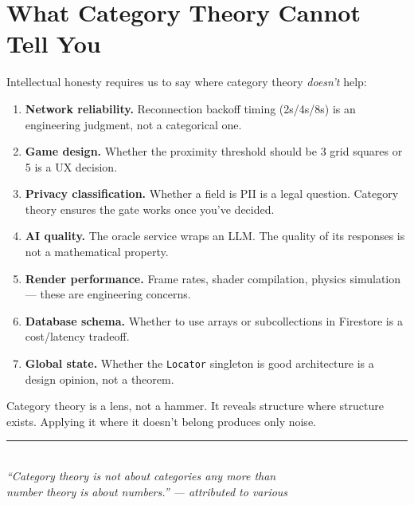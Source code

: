 \documentclass[12pt,a4paper]{article}
\theoremstyle{definition}
\theoremstyle{plain}
\theoremstyle{remark}
\begin{document}
\section{What Category Theory Cannot Tell You}

Intellectual honesty requires us to say where category theory
\emph{doesn't} help:

\begin{enumerate}
  \item \textbf{Network reliability.} Reconnection backoff timing
        (2s/4s/8s) is an engineering judgment, not a categorical one.
  \item \textbf{Game design.} Whether the proximity threshold should be
        3 grid squares or 5 is a UX decision.
  \item \textbf{Privacy classification.} Whether a field is PII is a legal
        question. Category theory ensures the gate works once you've decided.
  \item \textbf{AI quality.} The oracle service wraps an LLM. The quality
        of its responses is not a mathematical property.
  \item \textbf{Render performance.} Frame rates, shader compilation,
        physics simulation --- these are engineering concerns.
  \item \textbf{Database schema.} Whether to use arrays or subcollections
        in Firestore is a cost/latency tradeoff.
  \item \textbf{Global state.} Whether the \texttt{Locator} singleton is
        good architecture is a design opinion, not a theorem.
\end{enumerate}

Category theory is a lens, not a hammer. It reveals structure where structure
exists. Applying it where it doesn't belong produces only noise.

\vspace{2em}
\begin{center}
\rule{0.5\textwidth}{0.4pt}\\[1em]
\textit{``Category theory is not about categories any more than\\
number theory is about numbers.'' --- attributed to various}
\end{center}
\end{document}
